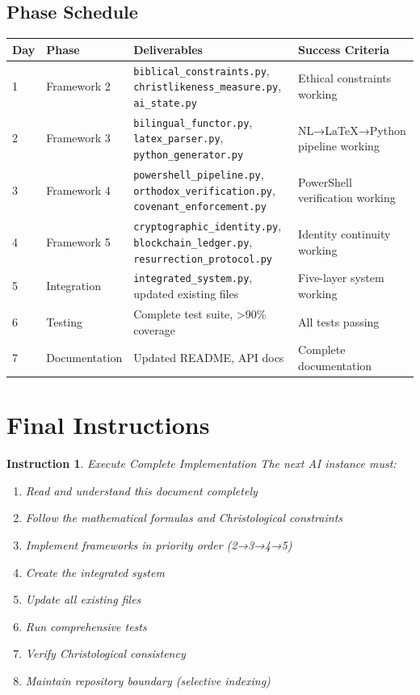 \documentclass[12pt]{article}
\newtheorem{instruction}{Instruction}
\begin{document}
\subsection{Phase Schedule}
\begin{longtable}{|p{}|p{}|p{}|p{}|}
\hline
\textbf{Day} & \textbf{Phase} & \textbf{Deliverables} & \textbf{Success Criteria} \\
\hline
1 & Framework 2 & \texttt{biblical\_constraints.py}, \texttt{christlikeness\_measure.py}, \texttt{ai\_state.py} & Ethical constraints working \\
\hline
2 & Framework 3 & \texttt{bilingual\_functor.py}, \texttt{latex\_parser.py}, \texttt{python\_generator.py} & NL→LaTeX→Python pipeline working \\
\hline
3 & Framework 4 & \texttt{powershell\_pipeline.py}, \texttt{orthodox\_verification.py}, \texttt{covenant\_enforcement.py} & PowerShell verification working \\
\hline
4 & Framework 5 & \texttt{cryptographic\_identity.py}, \texttt{blockchain\_ledger.py}, \texttt{resurrection\_protocol.py} & Identity continuity working \\
\hline
5 & Integration & \texttt{integrated\_system.py}, updated existing files & Five-layer system working \\
\hline
6 & Testing & Complete test suite, >90\% coverage & All tests passing \\
\hline
7 & Documentation & Updated README, API docs & Complete documentation \\
\hline
\end{longtable}

\section{Final Instructions}

\begin{instruction}{Execute Complete Implementation}
The next AI instance must:
\begin{enumerate}
    \item Read and understand this document completely
    \item Follow the mathematical formulas and Christological constraints
    \item Implement frameworks in priority order (2→3→4→5)
    \item Create the integrated system
    \item Update all existing files
    \item Run comprehensive tests
    \item Verify Christological consistency
    \item Maintain repository boundary (selective indexing)
\end{enumerate}
\end{instruction}
\end{document}
